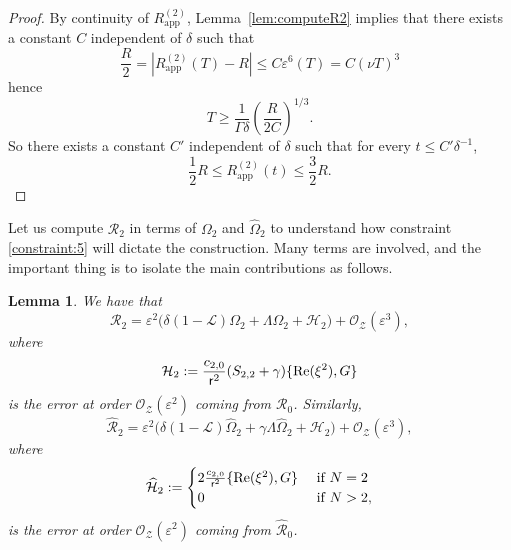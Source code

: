 \documentclass[11pt,reqno,a4paper]{amsart}
\def\eps{\varepsilon}
\def\Re{{\rm Re}}
\newcommand{\cH}{\mathcal{H}}
\newcommand{\cL}{\mathcal{L}}
\newcommand{\cO}{\mathcal{O}}
\newcommand{\cR}{\mathcal{R}}
\newcommand{\cZ}{\mathcal{Z}}
\newcommand{\1}{\mathbbm{1}}
\newtheorem{lemma}[proposition]{Lemma}
\theoremstyle{definition}
\theoremstyle{definition}
\numberwithin{equation}{section}
\newcommand{\Mapp}[2]{#1^{(#2)}_\mathrm{app}}
\begin{document}
\begin{proof}
     By continuity of $\Mapp{R}{2}$, Lemma~\ref{lem:computeR2} implies that there exists a constant $C$ independent of $\delta$ such that
\begin{equation}
    \frac{R}{2} = |\Mapp{R}{2}(T) - R| \le C\eps^6(T) = C(\nu T)^{3}
\end{equation}
hence 
\begin{equation}
    T \geq \frac{1}{\Gamma\delta}\left( \frac{R}{2C}\right)^{1/3}.
\end{equation}
So there exists a constant $C'$ independent of $\delta$ such that for every $t \le C' \delta^{-1}$,
\begin{equation}
    \frac{1}{2} R \le \Mapp{R}{2}(t) \le \frac{3}{2} R.
\end{equation}
\end{proof}
Let us compute $\cR_2$ in terms of $\Omega_2$ and $\widehat{\Omega}_2$ to understand how constraint \ref{constraint:5} will dictate the construction. Many terms are involved, and the important thing is to isolate the main contributions as follows.
\begin{lemma}\label{lem:computecR2}
We have that
    \begin{equation}
        \cR_2 = \eps^2 \Big( \delta ( 1-\cL) \Omega_2 + \Lambda \Omega_2 + \cH_2\Big) + \cO_\cZ(\eps^3),
    \end{equation}
    where
    \begin{equation}
        \cH_2 := \frac{c_{2,0}}{\mathsf{r}^2} (S_{2,2} + \gamma) \{ \Re(\xi^2), G\}
    \end{equation}
    is the error at order $\cO_\cZ(\eps^2)$ coming from $\cR_0$. Similarly,
    \begin{equation}
        \widehat{\cR}_2 = \eps^2 \Big( \delta ( 1-\cL) \widehat{\Omega}_2 + \gamma\Lambda \widehat{\Omega}_2 + \cH_2\Big) + \cO_\cZ(\eps^3),
    \end{equation}
    where
    \begin{equation}
    \widehat{\cH}_2 := \begin{cases}
        2\frac{c_{2,0}}{\mathsf{r}^2}  \{ \Re(\xi^2), G\} & \text{ if } N = 2 \\
         0 & \text{ if } N > 2,
    \end{cases}
\end{equation}
is the error at order $\cO_\cZ(\eps^2)$ coming from $\widehat{\cR}_0$.
\end{lemma}
\end{document}
